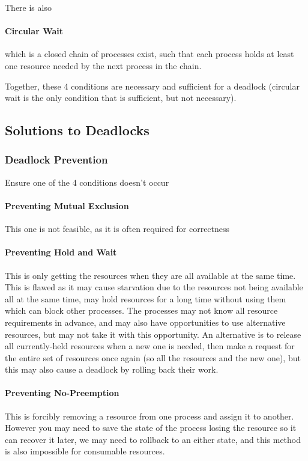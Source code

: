 \documentclass{article}
\begin{document}
There is also

\paragraph{Circular Wait} which is a closed chain of processes exist, such that each process holds at least one resource needed by the next process in the chain.

Together, these 4 conditions are necessary and sufficient for a deadlock (circular wait is the only condition that is sufficient, but not necessary).

\subsection{Solutions to Deadlocks}

\subsubsection{Deadlock Prevention}

Ensure one of the 4 conditions doesn't occur
\paragraph{Preventing Mutual Exclusion} This one is not feasible, as it is often required for correctness

\paragraph{Preventing Hold and Wait} This is only getting the resources when they are all available at the same time. This is flawed as it may cause starvation due to the resources not being available all at the same time, may hold resources for a long time without using them which can block other processes. The processes may not know all resource requirements in advance, and may also have opportunities to use alternative resources, but may not take it with this opportunity. An alternative is to release all currently-held resources when a new one is needed, then make a request for the entire set of resources once again (so all the resources and the new one), but this may also cause a deadlock by rolling back their work.

\paragraph{Preventing No-Preemption} This is forcibly removing a resource from one process and assign it to another. However you may need to save the state of the process losing the resource so it can recover it later, we may need to rollback to an either state, and this method is also impossible for consumable resources.
\end{document}
